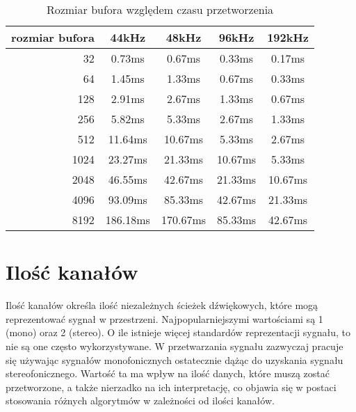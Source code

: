 \begin{table}[H]
    \begin{center}
        \caption{Rozmiar bufora względem czasu przetworzenia}
        \label{tab:wielkość bufora}
        \begin{tabular}{r|c|c|c|c}
            rozmiar bufora  &   44kHz  &   48kHz  &  96kHz  &  192kHz \\
            \hline
            32              &   0.73ms &   0.67ms &  0.33ms &  0.17ms \\
            64              &   1.45ms &   1.33ms &  0.67ms &  0.33ms \\
            128             &   2.91ms &   2.67ms &  1.33ms &  0.67ms \\
            256             &   5.82ms &   5.33ms &  2.67ms &  1.33ms \\
            512             &  11.64ms &  10.67ms &  5.33ms &  2.67ms \\
            1024            &  23.27ms &  21.33ms & 10.67ms &  5.33ms \\
            2048            &  46.55ms &  42.67ms & 21.33ms & 10.67ms \\
            4096            &  93.09ms &  85.33ms & 42.67ms & 21.33ms \\
            8192            & 186.18ms & 170.67ms & 85.33ms & 42.67ms \\
        \end{tabular}
    \end{center}
\end{table}



\section{Ilość kanałów}
Ilość kanałów określa ilość niezależnych ścieżek dźwiękowych, które mogą reprezentować sygnał w przestrzeni. Najpopularniejszymi wartościami są 1 (mono) oraz 2 (stereo). O ile istnieje więcej standardów reprezentacji sygnału, to nie są one często wykorzystywane. W przetwarzania sygnału zazwyczaj pracuje się używając sygnałów monofonicznych ostatecznie dążąc do uzyskania sygnału stereofonicznego. Wartość ta ma wpływ na ilość danych, które muszą zostać przetworzone, a także nierzadko na ich interpretację, co objawia się w postaci stosowania różnych algorytmów w zależności od ilości kanałów.

